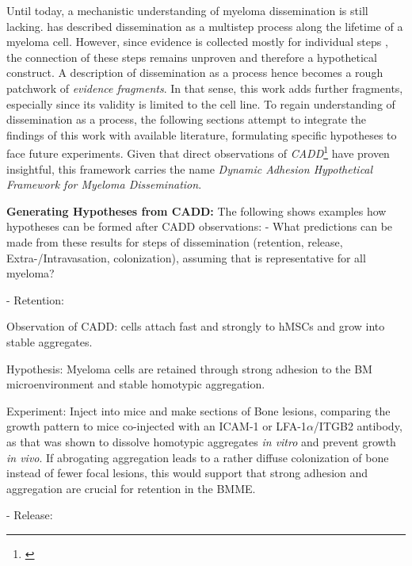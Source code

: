 %
\label{sec:discussion_framework}%
Until today, a mechanistic understanding of myeloma dissemination is still
lacking. \citet{zeissigTumourDisseminationMultiple2020} has described
dissemination as a multistep process along the lifetime of a myeloma cell.
However, since evidence is collected mostly for individual steps , the connection of these steps remains unproven
and therefore a hypothetical construct. A description of dissemination as a
process hence becomes a rough patchwork of \emph{evidence fragments}. In that
sense, this work adds further fragments, especially since its validity is
limited to the \INA cell line. To regain understanding of dissemination as a
process, the following sections attempt to integrate the findings of this work
with available literature, formulating specific hypotheses to face future
experiments. Given that direct observations of
\emph{\ac{CADD}}\footnote{\footcadd\label{foot:cadd}} have proven insightful,
this framework carries the name \emph{Dynamic Adhesion Hypothetical Framework
      for Myeloma Dissemination}.


\textbf{Generating Hypotheses from CADD:}
The following shows examples how hypotheses can be formed after \ac{CADD}
observations:
- What predictions can be made from these results for steps of
dissemination (retention, release, Extra-/Intravasation, colonization), assuming
that \INA  is representative for all myeloma?

- Retention:

Observation of CADD: \INA  cells attach fast and strongly to \acp{hMSC} and grow
into stable aggregates.

Hypothesis: Myeloma cells are retained through strong adhesion to the BM
microenvironment and stable homotypic aggregation.

Experiment: Inject \INA  into mice and make sections of Bone lesions, comparing
the growth pattern to mice co-injected with an ICAM-1 or LFA-1$\alpha$/ITGB2
antibody, as that was shown to dissolve homotypic aggregates \textit{in vitro}
and prevent \INA growth \textit{in vivo}\cite{kawanoHomotypicCellAggregations1991a,
      klauszNovelFcengineeredHuman2017}. If abrogating aggregation leads to a rather
diffuse colonization of bone instead of fewer focal lesions, this would support
that strong adhesion and aggregation are crucial for retention in the BMME.



- Release:


